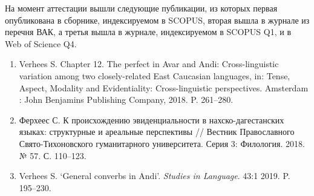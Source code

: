 \par На момент аттестации вышли следующие публикации, из которых первая опубликована в сборнике, индексируемом в SCOPUS, вторая вышла в журнале из перечня ВАК, а третья вышла в журнале, индексируемом в SCOPUS Q1, и в Web of Science  Q4. %

\begin{enumerate}
    \item Verhees S. Chapter 12. The perfect in Avar and Andi: Cross-linguistic variation among two closely-related East Caucasian languages, in: Tense, Aspect, Modality and Evidentiality: Cross-linguistic perspectives. Amsterdam : John Benjamins Publishing Company, 2018. P. 261--280.
    \item Ферхеес С. К происхождению эвиденциальности в нахско-дагестанских языках: структурные и ареальные перспективы // Вестник Православного Свято-Тихоновского гуманитарного университета. Серия 3: Филология. 2018. № 57. С. 110--123.
    \item Verhees S. `General converbs in Andi'. \textit{Studies in Language}. 43:1 2019. P. 195--230.
\end{enumerate}

